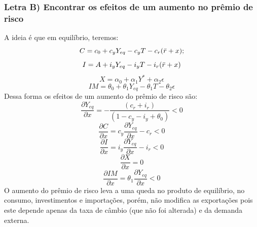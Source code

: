 \documentclass{article}
\begin{document}
\subsubsection*{Letra B) Encontrar os efeitos de um aumento no prêmio de risco} 
A ideia é que em equilíbrio, teremos:
\begin{equation*}
    C=c_0 + c_y Y_{eq} -c_y T - c_r (\Bar{r}+x); 
\end{equation*}
\begin{equation*}
    I=A+i_y Y_{eq}-i_y T - i_r (\Bar{r}+x)
\end{equation*}
\begin{equation*}
    X=\alpha_0+\alpha_1 Y^* + \alpha_2 \epsilon
\end{equation*}
\begin{equation*}
    IM=\theta_0+\theta_1 Y_{eq} - \theta_1 T - \theta_2 \epsilon
\end{equation*}
Dessa forma os efeitos de um aumento do prêmio de risco são:
\begin{equation}
    \frac{\partial Y_{eq}}{\partial x} = -\frac{(c_r+i_r)}{(1-c_y-i_y+\theta_0)} < 0
\end{equation}
\begin{equation}
    \frac{\partial C}{\partial x} = c_y \frac{\partial Y_{eq}}{\partial x} - c_r < 0
\end{equation}
\begin{equation}
    \frac{\partial I}{\partial x} = i_y \frac{\partial Y_{eq}}{\partial x} - i_r < 0
\end{equation}
\begin{equation}
    \frac{\partial X}{\partial x} = 0
\end{equation}
\begin{equation}
    \frac{\partial IM}{\partial x} = \theta_1 \frac{\partial Y_{eq}}{\partial x} < 0
\end{equation}
O aumento do prêmio de risco leva a uma queda no produto de equilíbrio, no consumo, investimentos e importações, porém, não modifica as exportações pois este depende apenas da taxa de câmbio (que não foi alterada) e da demanda externa.
\end{document}
